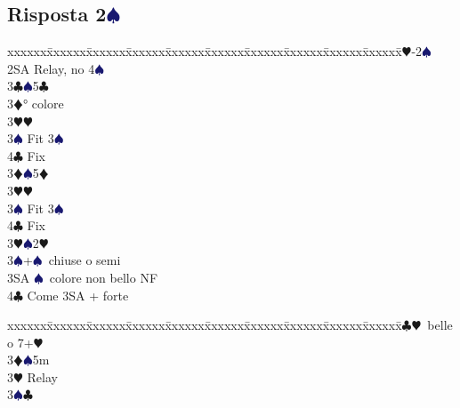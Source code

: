 \documentclass[a4paper,italian]{article}
\newcommand{\BC}{\textcolor{OliveGreen}{$\clubsuit$}}
\newcommand{\BD}{\textcolor{RedOrange}{$\vardiamondsuit$}}
\newcommand{\BH}{\textcolor{Red2}{$\varheartsuit${}}}
\newcommand{\BS}{\textcolor{MidnightBlue}{$\spadesuit${}}}
\newcommand{\pdfs}{\texorpdfstring{\BS{}}{S}}
\newenvironment{bidtable}
{\begin{tabbing}

    xxxxxx\=xxxxxx\=xxxxxx\=xxxxxx\=xxxxxx\=xxxxxx\=xxxxxx\=xxxxxx\=xxxxxx\=xxxxxx\=\kill}
{\end{tabbing} }%
\begin{document}
                                    \subsection{Risposta 2\pdfs}
                                    \begin{multicols}{2}
                                        \begin{bidtable}
                                            1\BH-2\BS\+\\
                                            2SA \> Relay, no 4\BS \+\\
                                            3\BC {}\BS 5\BC \+\\
                                            3\BD {}° colore\\
                                            3\BH {}\BH \\
                                            3\BS \> Fit 3\BS \\
                                            4\BC \> Fix\-\\
                                            3\BD {}\BS 5\BD \+\\
                                            3\BH {}\BH \\
                                            3\BS \> Fit 3\BS \\
                                            4\BC \> Fix\-\\
                                            3\BH {}\BS 2\BH \\
                                            3\BS {}+\BS\ chiuse o semi\\
                                            3SA \BS\ colore non bello NF\\
                                            4\BC \> Come 3SA + forte\\
                                        \end{bidtable}
                                        \columnbreak
                                        \begin{bidtable}
                                            3\BC {}\BH\ belle o 7+\BH \+\\
                                            3\BD {}\BS 5m\+\\
                                            3\BH \> Relay\+\\
                                            3\BS {}\BC \\

\end{bidtable}
\end{multicols}
\end{document}
